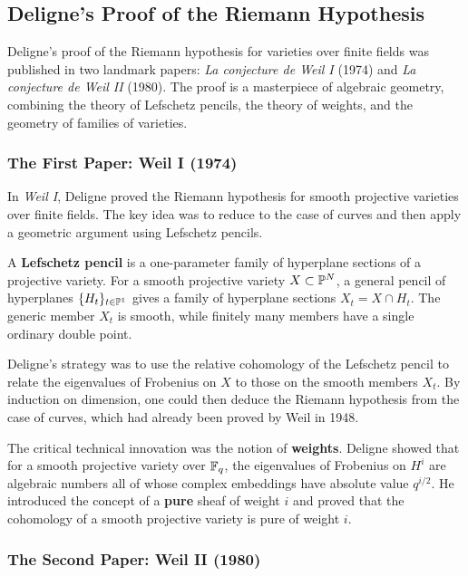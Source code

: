\subsection{Deligne's Proof of the Riemann Hypothesis}

Deligne's proof of the Riemann hypothesis for varieties over finite fields was published in two landmark papers: \textit{La conjecture de Weil I} (1974) and \textit{La conjecture de Weil II} (1980). The proof is a masterpiece of algebraic geometry, combining the theory of Lefschetz pencils, the theory of weights, and the geometry of families of varieties.

\subsubsection{The First Paper: Weil I (1974)}

In \textit{Weil I}, Deligne proved the Riemann hypothesis for smooth projective varieties over finite fields. The key idea was to reduce to the case of curves and then apply a geometric argument using Lefschetz pencils.

A \textbf{Lefschetz pencil} is a one-parameter family of hyperplane sections of a projective variety. For a smooth projective variety \(X \subset \P^N\), a general pencil of hyperplanes \(\{H_t\}_{t \in \P^1}\) gives a family of hyperplane sections \(X_t = X \cap H_t\). The generic member \(X_t\) is smooth, while finitely many members have a single ordinary double point.

Deligne's strategy was to use the relative cohomology of the Lefschetz pencil to relate the eigenvalues of Frobenius on \(X\) to those on the smooth members \(X_t\). By induction on dimension, one could then deduce the Riemann hypothesis from the case of curves, which had already been proved by Weil in 1948.

The critical technical innovation was the notion of \textbf{weights}. Deligne showed that for a smooth projective variety over \(\F_q\), the eigenvalues of Frobenius on \(H^i\) are algebraic numbers all of whose complex embeddings have absolute value \(q^{i/2}\). He introduced the concept of a \textbf{pure} sheaf of weight \(i\) and proved that the cohomology of a smooth projective variety is pure of weight \(i\).

\subsubsection{The Second Paper: Weil II (1980)}

